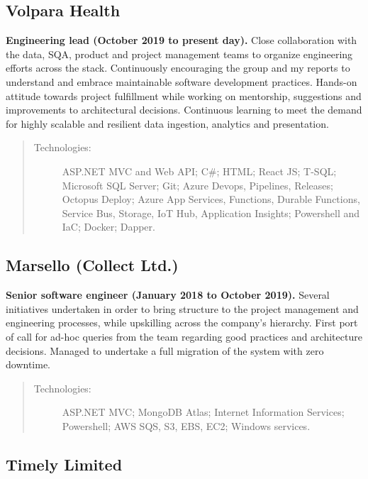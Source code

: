 \subsection*{Volpara Health}

\textbf{Engineering lead (October 2019 to present day).} Close collaboration with the data, SQA, product and project management teams to organize engineering efforts across the stack. Continuously encouraging the group and my reports to understand and embrace maintainable software development practices. Hands-on attitude towards project fulfillment while working on mentorship, suggestions and improvements to architectural decisions. Continuous learning to meet the demand for highly scalable and resilient data ingestion, analytics and presentation.

\begin{quote}
\begin{description}
    \item[Technologies:] ASP.NET MVC and Web API; C\#; HTML; React JS; T-SQL; Microsoft SQL Server; Git; Azure Devops, Pipelines, Releases; Octopus Deploy; Azure App Services, Functions, Durable Functions, Service Bus, Storage, IoT Hub, Application Insights; Powershell and IaC; Docker; Dapper.
\end{description}
\end{quote}

\subsection*{Marsello (Collect Ltd.)}

\textbf{Senior software engineer (January 2018 to October 2019).} Several initiatives undertaken in order to bring structure to the project management and engineering processes, while upskilling across the company's hierarchy. First port of call for ad-hoc queries from the team regarding good practices and architecture decisions. Managed to undertake a full migration of the system with zero downtime.

\begin{quote}
\begin{description}
    \item[Technologies:] ASP.NET MVC; MongoDB Atlas; Internet Information Services; Powershell; AWS SQS, S3, EBS, EC2; Windows services.
\end{description}
\end{quote}

\subsection*{Timely Limited}

